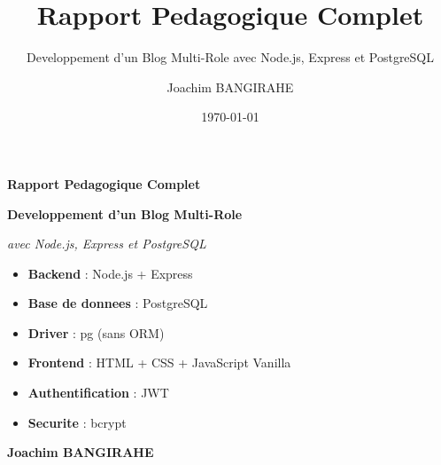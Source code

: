 \documentclass[a4paper,12pt]{book}
\title{\textbf{\Huge Rapport Pedagogique Complet}}
\subtitle{\Large Developpement d'un Blog Multi-Role avec Node.js, Express et PostgreSQL}
\author{Joachim BANGIRAHE}
\date{\today}
\begin{document}
\begin{titlepage}
    \centering
    \vspace*{2cm}
    {\Huge\bfseries\color{deepblue} Rapport Pedagogique Complet\par}
    \vspace{1cm}
    {\Large\bfseries\color{darkblue} Developpement d'un Blog Multi-Role\par}
    \vspace{0.5cm}
    {\large\itshape avec Node.js, Express et PostgreSQL\par}
    \vspace{2cm}

    \begin{tcolorbox}[colback=white,colframe=deepblue,width=0.8\textwidth,center,title=Stack Technologique]
        \begin{itemize}
            \item \textbf{Backend} : Node.js + Express
            \item \textbf{Base de donnees} : PostgreSQL
            \item \textbf{Driver} : pg (sans ORM)
            \item \textbf{Frontend} : HTML + CSS + JavaScript Vanilla
            \item \textbf{Authentification} : JWT
            \item \textbf{Securite} : bcrypt
        \end{itemize}
    \end{tcolorbox}

    \vspace{2cm}
    {\Large\bfseries Joachim BANGIRAHE\par}
\end{titlepage}

\frontmatter
\tableofcontents
\cleardoublepage
\mainmatter

\end{document}
